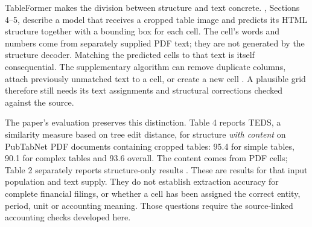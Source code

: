 \enlargethispage{\baselineskip}
TableFormer makes the division between structure and text concrete.
\citet{nassar2022tableformer}, Sections 4--5, describe a model that receives a
cropped table image and predicts its HTML structure together with a bounding
box for each cell. The cell's words and numbers come from separately supplied
PDF text; they are not generated by the structure decoder. Matching the
predicted cells to that text is itself consequential. The supplementary
algorithm can remove duplicate columns, attach previously unmatched text to a
cell, or create a new cell \citep[Section 2]{nassar2022tableformersupp}. A
plausible grid therefore still needs its text assignments and structural
corrections checked against the source.

The paper's evaluation preserves this distinction. Table 4 reports TEDS,
a similarity measure based on tree edit distance, for structure \emph{with
content} on PubTabNet PDF documents containing cropped tables: 95.4 for simple
tables, 90.1 for complex tables and 93.6 overall. The content comes from PDF
cells; Table 2 separately reports structure-only results
\citep[Tables 2 and 4, p.~4620]{nassar2022tableformer}. These are results for
that input population and text supply. They do not establish extraction
accuracy for complete financial filings, or whether a cell has been assigned
the correct entity, period, unit or accounting meaning. Those questions require
the source-linked accounting checks developed here.


